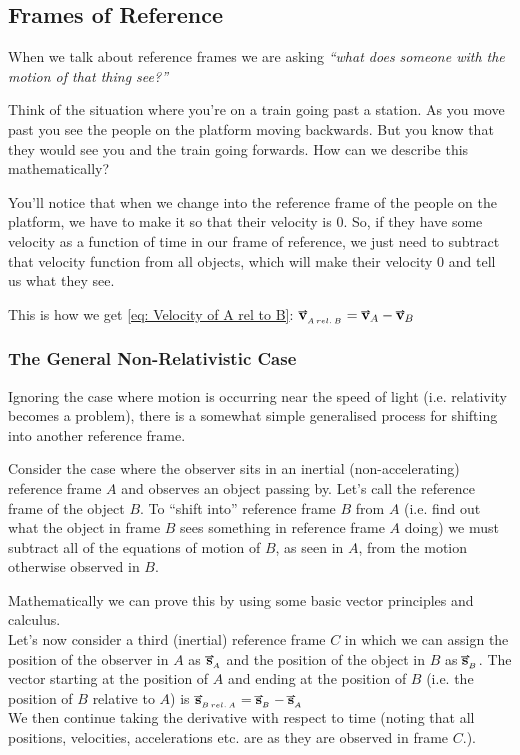 \documentclass[main.tex]{subfiles}
\begin{document}
                \newpage
                \subsection{Frames of Reference}
                    \label{subsec: Frames of Reference}

                    When we talk about reference frames we are asking \textit{``what does someone with the motion of that thing see?''}

                    Think of the situation where you're on a train going past a station. As you move past you see the people on the platform moving backwards. But you know that they would see you and the train going forwards. How can we describe this mathematically?

                    You'll notice that when we change into the reference frame of the people on the platform, we have to make it so that their velocity is 0. So, if they have some velocity as a function of time in our frame of reference, we just need to subtract that velocity function from all objects, which will make their velocity 0 and tell us what they see.

                    This is how we get \eqref{eq: Velocity of A rel to B}: $\vect{v}_{_{A\, rel.\, B}} = \vect{v}_A - \vect{v}_B$

                    \subsubsection{The General Non-Relativistic Case}

                        Ignoring the case where motion is occurring near the speed of light (i.e. relativity becomes a problem), there is a somewhat simple generalised process for shifting into another reference frame.

                        Consider the case where the observer sits in an inertial (non-accelerating) reference frame $A$ and observes an object passing by. Let's call the reference frame of the object $B$. To ``shift into'' reference frame $B$ from $A$ (i.e. find out what the object in frame $B$ sees something in reference frame $A$ doing) we must subtract all of the equations of motion of $B$, as seen in $A$, from the motion otherwise observed in $B$.

                        Mathematically we can prove this by using some basic vector principles and calculus.\\
                        Let's now consider a third (inertial) reference frame $C$ in which we can assign the position of the observer in $A$ as $\vect{s}_{_A}$ and the position of the object in $B$ as $\vect{s}_{_B}$. The vector starting at the position of $A$ and ending at the position of $B$ (i.e. the position of $B$ relative to $A$) is $\vect{s}_{_{B\, rel.\, A}} = \vect{s}_{_B} - \vect{s}_{_A}$\\
                        We then continue taking the derivative with respect to time (noting that all positions, velocities, accelerations etc. are as they are observed in frame $C$.).
\end{document}
